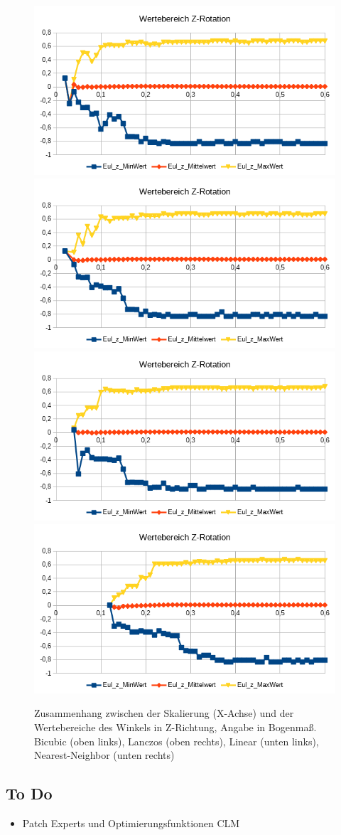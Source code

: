 \begin{figure}
	\centering
	\includegraphics[width=0.45\linewidth]{tabelle2/Z_Rot_Val_Cubic}
	\includegraphics[width=0.45\linewidth]{tabelle2/Z_Rot_Val_Lanc}
	\includegraphics[width=0.45\linewidth]{tabelle2/Z_Rot_Val_Linear}
	\includegraphics[width=0.45\linewidth]{tabelle2/Z_Rot_Val_NN}
	\caption{Zusammenhang zwischen der Skalierung (X-Achse) und der Wertebereiche des Winkels in Z-Richtung, Angabe in Bogenmaß.
		Bicubic (oben links), Lanczos (oben rechts), Linear (unten links), Nearest-Neighbor (unten rechts)}
	\label{img_Z_Rot_Val_Skal}
\end{figure}
\subsection{To Do}
\begin{itemize}
	\item Patch Experts und Optimierungsfunktionen CLM
\end{itemize}